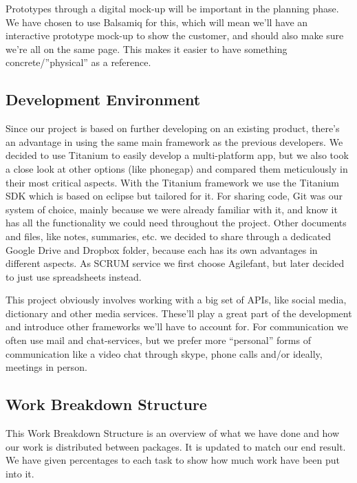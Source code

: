 Prototypes through a digital mock-up will be important in the planning phase. We have chosen to use Balsamiq for this, which will mean we’ll have an interactive prototype mock-up to show the customer, and should also make sure we're all on the same page. This makes it easier to have something concrete/”physical” as a reference.

\subsection{Development Environment}

Since our project is based on further developing on an existing product, there’s an advantage in using the same main framework as the previous developers. We decided to use Titanium to easily develop a multi-platform app, but we also took a close look at other options (like phonegap) and compared them meticulously in their most critical aspects. With the Titanium framework we use the Titanium SDK which is based on eclipse but tailored for it. For sharing code, Git was our system of choice, mainly because we were already familiar with it, and know it has all the functionality we could need throughout the project. Other documents and files, like notes, summaries, etc. we decided to share through a dedicated Google Drive and Dropbox folder, because each has its own advantages in different aspects. As SCRUM service we first choose Agilefant, but later decided to just use spreadsheets instead.

This project obviously involves working with a big set of APIs, like social media, dictionary and other media services. These’ll play a great part of the development and introduce other frameworks we’ll have to account for. For communication we often use mail and chat-services, but we prefer more “personal” forms of communication like a video chat through skype, phone calls and/or ideally, meetings in person.

\subsection{Work Breakdown Structure}
This Work Breakdown Structure is an overview of what we have done and how our work is distributed between packages. It is updated to match our end result.
We have given percentages to each task to show how much work have been put into it.

